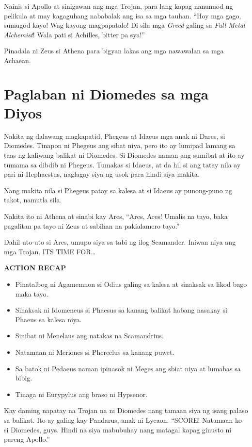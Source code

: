 \documentclass[12pt,letterpaper]{report}
\newenvironment{recap}{\begin{center}{\large\textbf{ACTION RECAP}}\begin{itemize}}{\end{itemize}\end{center}}
\begin{document}
Nainis si Apollo at sinigawan ang mga Trojan, para lang kapag nanunuod ng pelikula at may kagaguhang nababalak ang isa sa mga tauhan. ``Hoy mga gago, sumugod kayo! Wag kayong magpapatalo! Di sila mga \textit{Greed} galing sa \textit{Full Metal Alchemist}! Wala pati si Achilles, bitter pa sya!''

Pinadala ni Zeus si Athena para bigyan lakas ang mga nawawalan sa mga Achaean.

\pagebreak
\chapter{Paglaban ni Diomedes sa mga Diyos} %

Nakita ng dalawang magkapatid, Phegeus at Idaeus mga anak ni Dares, si Diomedes. Tinapon ni Phegeus ang sibat niya, pero ito ay lumipad lamang sa taas ng kaliwang balikat ni Diomedes. Si Diomedes naman ang sumibat at ito ay tumama sa dibdib ni Phegeus. Tumakas si Idaeus, at da   hil si ang tatay nila ay pari ni Hephaestus, naglagay siya ng usok para hindi siya makita.

Nang makita nila si Phegeus patay sa kalesa at si Idaeus ay punong-puno ng takot, namutla sila.

Nakita ito ni Athena at sinabi kay Ares, ``Ares, Ares! Umalis na tayo, baka pagalitan pa tayo ni Zeus at sabihan na pakialamero tayo.''

Dahil uto-uto si Ares, umupo siya sa tabi ng ilog Scamander. Iniwan niya ang mga Trojan. ITS TIME FOR\dots

\begin{recap}
    \item Pinatalbog ni Agamemnon si Odius galing sa kalesa at sinaksak sa likod bago maka tayo.
    \item Sinaksak ni Idomeneus si Phaesus sa kanang balikat habang nasakay si Phaeus sa kalesa niya.
    \item Sinibat ni Menelaus ang natakas na Scamandrius.
    \item Natamaan ni Meriones si Phereclus sa kanang puwet.
    \item Sa batok ni Pedaeus naman ipinasok ni Meges ang sbiat niya at lumabas sa bibig.
    \item Tinaga ni Eurypylus ang braso ni Hypsenor.
\end{recap}

Kay daming napatay na Trojan na ni Diomedes nang tamaan siya ng isang palaso sa balikat. Ito ay galing kay Pandarus, anak ni Lycaon. ``SCORE! Natamaan ko si Diomedes, guys. Hindi na siya mabubuhay nang matagal kapag ginusto ni pareng Apollo.''
\end{document}
